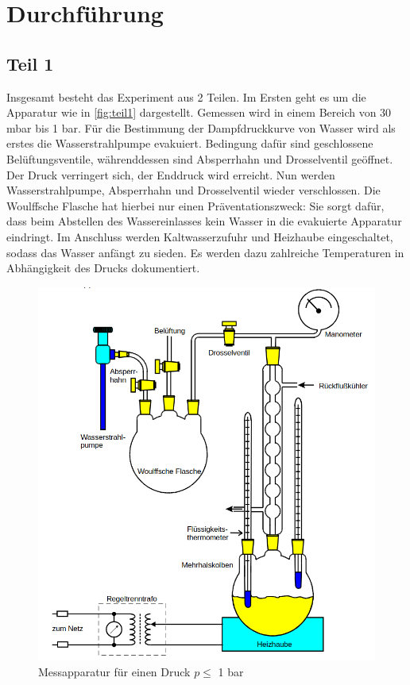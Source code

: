 \section{Durchführung}
\label{sec:Durchführung}

\subsection{Teil 1}
Insgesamt besteht das Experiment aus 2 Teilen. Im Ersten geht es um die 
Apparatur wie in \autoref{fig:teil1} dargestellt. Gemessen wird in einem 
Bereich von 30 mbar bis 1 bar. Für die Bestimmung der Dampfdruckkurve von 
Wasser wird als erstes die Wasserstrahlpumpe evakuiert. Bedingung dafür sind 
geschlossene Belüftungsventile, währenddessen sind Absperrhahn und Drosselventil 
geöffnet. Der Druck verringert sich, der Enddruck wird erreicht. Nun werden 
Wasserstrahlpumpe, Absperrhahn und Drosselventil wieder verschlossen. Die 
Woulffsche Flasche hat hierbei nur einen Präventationszweck: Sie sorgt dafür, 
dass beim Abstellen des Wassereinlasses kein Wasser in die evakuierte Apparatur 
eindringt. Im Anschluss werden Kaltwasserzufuhr und Heizhaube eingeschaltet, 
sodass das Wasser anfängt zu sieden. Es werden dazu zahlreiche Temperaturen 
in Abhängigkeit des Drucks dokumentiert.
\begin{figure}[h!]
    \centering
        \centering
        \includegraphics[width=\textwidth]{Bilder/teil1.png}
        \caption{Messapparatur für einen Druck $p \leq$ 1 bar \cite{teil1}}
    \hfill
    \label{fig:teil1}
\end{figure}
